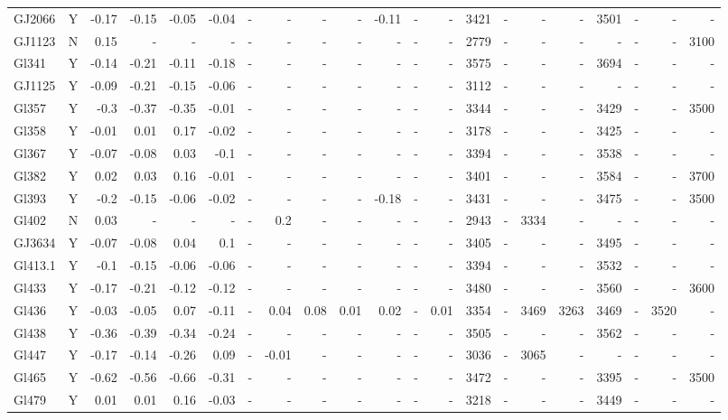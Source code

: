 \documentclass[referee]{aa}
\begin{document}
{\begin{landscape}
{\begin{longtable}{l c r r r r r r r r r r r | r r r r r r r r }
GJ2066 & Y & -0.17 & -0.15 & -0.05 & -0.04 & - & - & - & - & -0.11 & - & - & 3421 & - & - & - & 3501 & - & - & - \\
GJ1123 & N & 0.15 & - & - & - & - & - & - & - & - & - & - & 2779 & - & - & - & - & - & - & 3100 \\
Gl341 & Y & -0.14 & -0.21 & -0.11 & -0.18 & - & - & - & - & - & - & - & 3575 & - & - & - & 3694 & - & - & - \\
GJ1125 & Y & -0.09 & -0.21 & -0.15 & -0.06 & - & - & - & - & - & - & - & 3112 & - & - & - & - & - & - & - \\
Gl357 & Y & -0.3 & -0.37 & -0.35 & -0.01 & - & - & - & - & - & - & - & 3344 & - & - & - & 3429 & - & - & 3500 \\
Gl358 & Y & -0.01 & 0.01 & 0.17 & -0.02 & - & - & - & - & - & - & - & 3178 & - & - & - & 3425 & - & - & - \\
Gl367 & Y & -0.07 & -0.08 & 0.03 & -0.1 & - & - & - & - & - & - & - & 3394 & - & - & - & 3538 & - & - & - \\
Gl382 & Y & 0.02 & 0.03 & 0.16 & -0.01 & - & - & - & - & - & - & - & 3401 & - & - & - & 3584 & - & - & 3700 \\
Gl393 & Y & -0.2 & -0.15 & -0.06 & -0.02 & - & - & - & - & -0.18 & - & - & 3431 & - & - & - & 3475 & - & - & 3500 \\
Gl402 & N & 0.03 & - & - & - & - & 0.2 & - & - & - & - & - & 2943 & - & 3334 & - & - & - & - & - \\
GJ3634 & Y & -0.07 & -0.08 & 0.04 & 0.1 & - & - & - & - & - & - & - & 3405 & - & - & - & 3495 & - & - & - \\
Gl413.1 & Y & -0.1 & -0.15 & -0.06 & -0.06 & - & - & - & - & - & - & - & 3394 & - & - & - & 3532 & - & - & - \\
Gl433 & Y & -0.17 & -0.21 & -0.12 & -0.12 & - & - & - & - & - & - & - & 3480 & - & - & - & 3560 & - & - & 3600 \\
Gl436 & Y & -0.03 & -0.05 & 0.07 & -0.11 & - & 0.04 & 0.08 & 0.01 & 0.02 & - & 0.01 & 3354 & - & 3469 & 3263 & 3469 & - & 3520 & - \\
Gl438 & Y & -0.36 & -0.39 & -0.34 & -0.24 & - & - & - & - & - & - & - & 3505 & - & - & - & 3562 & - & - & - \\
Gl447 & Y & -0.17 & -0.14 & -0.26 & 0.09 & - & -0.01 & - & - & - & - & - & 3036 & - & 3065 & - & - & - & - & - \\
Gl465 & Y & -0.62 & -0.56 & -0.66 & -0.31 & - & - & - & - & - & - & - & 3472 & - & - & - & 3395 & - & - & 3500 \\
Gl479 & Y & 0.01 & 0.01 & 0.16 & -0.03 & - & - & - & - & - & - & - & 3218 & - & - & - & 3449 & - & - & - \\

\end{longtable}}
\end{landscape}}
\end{document}
